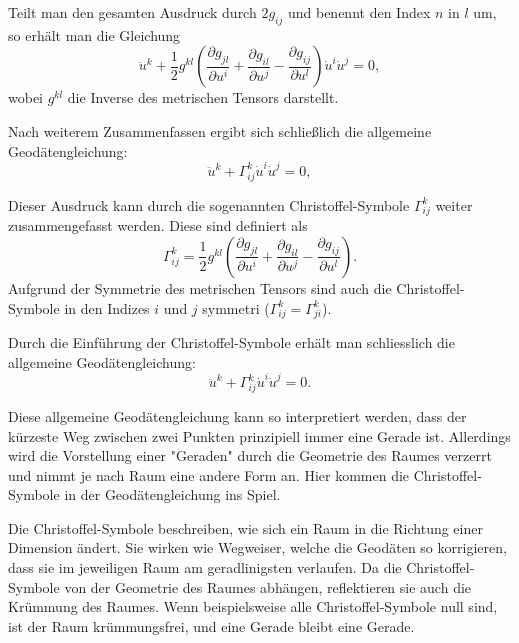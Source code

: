 Teilt man den gesamten Ausdruck durch $2g_{ij}$ und benennt den Index $n$ in $l$ um, so erhält man die Gleichung
\begin{equation}
	\ddot{u}^k + \frac{1}{2} g^{kl} \left( \frac{\partial g_{jl}}{\partial u^i} + \frac{\partial g_{il}}{\partial u^j} - \frac{\partial g_{ij}}{\partial u^l} \right) \dot{u}^i \dot{u}^j = 0,
\end{equation}
wobei $g^{kl}$ die Inverse des metrischen Tensors darstellt.


Nach weiterem Zusammenfassen ergibt sich schließlich die allgemeine Geodätengleichung:
\begin{equation} 
	\ddot{u}^k + \Gamma^k_{ij} \dot{u}^i \dot{u}^j = 0, 
	\label{geodaeten:equation:StandardverfahrenGeodaeten:Geodaetengleichung}
\end{equation}

Dieser Ausdruck kann durch die sogenannten Christoffel-Symbole $\Gamma^k_{ij}$ weiter zusammengefasst werden.
Diese sind definiert als
\begin{equation}

	\Gamma^k_{ij} = \frac{1}{2} g^{kl} \left( \frac{\partial g_{jl}}{\partial u^i} + \frac{\partial g_{il}}{\partial u^j} - \frac{\partial g_{ij}}{\partial u^l} \right).
\end{equation}
Aufgrund der Symmetrie des metrischen Tensors sind auch die Christoffel-Symbole in den Indizes $i$ und $j$ symmetri ($\Gamma^k_{ij} = \Gamma^k_{ji}$).

Durch die Einführung der Christoffel-Symbole erhält man schliesslich die allgemeine Geodätengleichung:
\begin{equation}
	\ddot{u}^k + \Gamma^k_{ij} \dot{u}^i \dot{u}^j = 0.
\end{equation}

Diese allgemeine Geodätengleichung kann so interpretiert werden, dass der kürzeste Weg zwischen zwei Punkten prinzipiell immer eine Gerade ist. 
Allerdings wird die Vorstellung einer "Geraden" durch die Geometrie des Raumes verzerrt und nimmt je nach Raum eine andere Form an. 
Hier kommen die Christoffel-Symbole in der Geodätengleichung ins Spiel.

Die Christoffel-Symbole beschreiben, wie sich ein Raum in die Richtung einer Dimension ändert.
Sie wirken wie Wegweiser, welche die Geodäten so korrigieren, dass sie im jeweiligen Raum am geradlinigsten verlaufen. 
Da die Christoffel-Symbole von der Geometrie des Raumes abhängen, reflektieren sie auch die Krümmung des Raumes.
Wenn beispielsweise alle Christoffel-Symbole null sind, ist der Raum krümmungsfrei, und eine Gerade bleibt eine Gerade.

